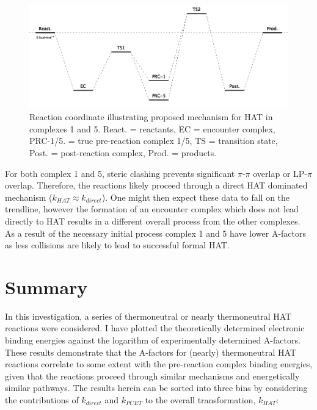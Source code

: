 
\begin{figure}[!htbp]
  \centering
  \includegraphics[width=\textwidth]{figures/encounter-pes.png}
  \caption[Reaction coordinate illustrating proposed mechanism for HAT in
  complexes 1 and 5.]{Reaction coordinate illustrating proposed mechanism for
  HAT in complexes 1 and 5. React. = reactants, EC = encounter complex,
  PRC-1/5. = true pre-reaction complex 1/5, TS = transition state, Post. =
  post-reaction complex, Prod. = products.} \label{fig:encounter-pes}
\end{figure}

For both complex 1 and 5, steric clashing prevents significant $\pi$-$\pi$
overlap or LP-$\pi$ overlap. Therefore, the reactions likely proceed through a
direct HAT dominated mechanism ($k_{HAT} \approx k_{direct}$). One might then
expect these data to fall on the trendline, however the formation of an
encounter complex which does not lead directly to HAT results in a different
overall process from the other complexes. As a result of the necessary initial
process complex 1 and 5 have lower A-factors as less collisions are likely to
lead to successful formal HAT.


\section{Summary}

In this investigation, a series of thermoneutral or nearly thermoneutral HAT
reactions were considered. I have plotted the theoretically determined
electronic binding energies against the logarithm of experimentally determined
A-factors. These results demonstrate that the A-factors for (nearly)
thermoneutral HAT reactions correlate to some extent with the pre-reaction
complex binding energies, given that the reactions proceed through similar
mechanisms and energetically similar pathways. The results herein can be sorted
into three bins by considering the contributions of $k_{direct}$ and $k_{PCET}$
to the overall transformation, $k_{HAT}$:

